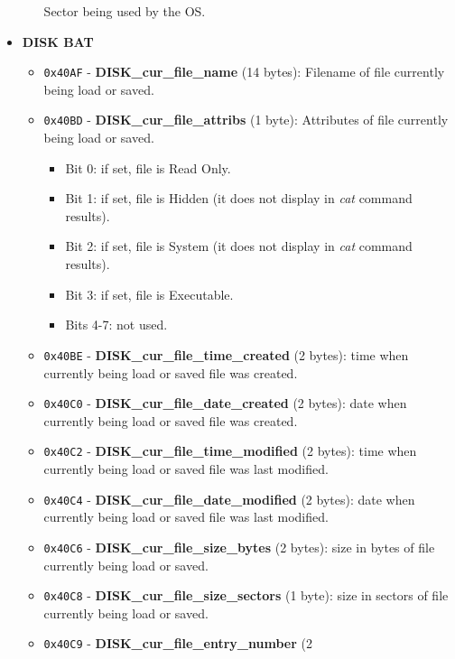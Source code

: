 \documentclass[a4paper,11pt]{article}
\begin{document}
\begin{itemize}
\begin{itemize}
            Sector being used by the OS.
        \end{itemize}
        \item \textbf{DISK BAT}
        \begin{itemize}
            \item \texttt{0x40AF} - \textbf{DISK\_cur\_file\_name} (14 bytes): 
            Filename of file currently being load or saved.
            \item \texttt{0x40BD} - \textbf{DISK\_cur\_file\_attribs} (1 byte):
            Attributes of file currently being load or saved.
            \begin{itemize}
                \item Bit 0: if set, file is Read Only.
                \item Bit 1: if set, file is Hidden (it does not display in
                \textit{cat} command results).
                \item Bit 2: if set, file is System (it does not display in
                \textit{cat} command results).
                \item Bit 3: if set, file is Executable.
                \item Bits 4-7: not used.
            \end{itemize}
            \item \texttt{0x40BE} - \textbf{DISK\_cur\_file\_time\_created} (2
            bytes): time when currently being load or saved file was created.
            \item \texttt{0x40C0} - \textbf{DISK\_cur\_file\_date\_created} (2
            bytes): date when currently being load or saved file was created.
            \item \texttt{0x40C2} - \textbf{DISK\_cur\_file\_time\_modified} (2
            bytes): time when currently being load or saved file was last modified.
            \item \texttt{0x40C4} - \textbf{DISK\_cur\_file\_date\_modified} (2
            bytes): date when currently being load or saved file was last modified.
            \item \texttt{0x40C6} - \textbf{DISK\_cur\_file\_size\_bytes} (2
            bytes): size in bytes of file currently being load or saved.
            \item \texttt{0x40C8} - \textbf{DISK\_cur\_file\_size\_sectors} (1
            byte): size in sectors of file currently being load or saved.
            \item \texttt{0x40C9} - \textbf{DISK\_cur\_file\_entry\_number} (2

\end{itemize}
\end{itemize}
\end{document}
